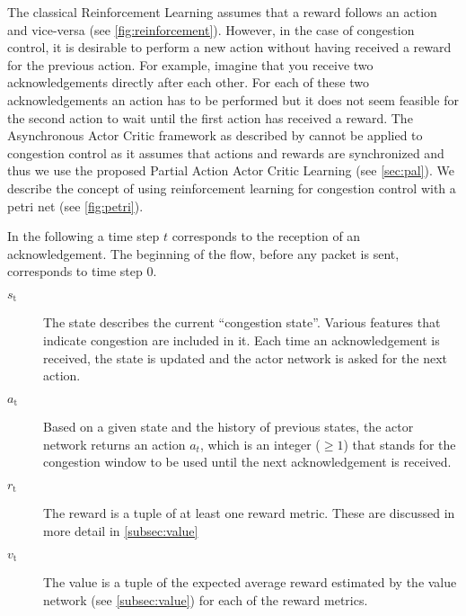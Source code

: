 \documentclass[sigconf]{acmart}
\begin{document}
The classical Reinforcement Learning assumes that a reward follows an action and vice-versa (see \autoref{fig:reinforcement}). However, in the case of congestion control, it is desirable to perform a new action without having received a reward for the previous action. For example, imagine that you receive two acknowledgements directly after each other. For each of these two acknowledgements an action has to be performed but it does not seem feasible for the second action to wait until the first action has received a reward. The Asynchronous Actor Critic framework as described by \cite{mnih_asynchronous_2016} cannot be applied to congestion control as it assumes that actions and rewards are synchronized and thus we use the proposed Partial Action Actor Critic Learning (see \autoref{sec:pal}). We describe the concept of using reinforcement learning for congestion control with a petri net (see \autoref{fig:petri}).

In the following a time step $t$ corresponds to the reception of an acknowledgement. The beginning of the flow, before any packet is sent, corresponds to time step $0$.

\begin{description}
\item[$\textit{s}_\text{t}$] The state  describes the current ``congestion state''. Various features that indicate congestion are included in it. Each time an acknowledgement is received, the state is updated and the actor network is asked for the next action. 
\item[$\textit{a}_\text{t}$] Based on a given state and the history of previous states, the actor network returns an action $a_t$, which is an integer ($\geq 1$) that stands for the congestion window to be used until the next acknowledgement is received. 
\item[$\textit{r}_\text{t}$] The reward is a tuple of at least one reward metric. These are discussed in more detail in \autoref{subsec:value}
\item[$\textit{v}_\text{t}$] The value is a tuple of the expected average reward estimated by the value network (see \autoref{subsec:value}) for each of the reward metrics. 
\end{description}
\end{document}
